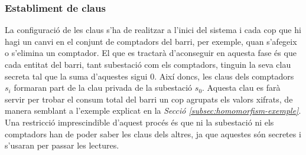 \documentclass{article}
\begin{document}
\subsubsection{Establiment de claus}\label{section:ks}
La configuració de les claus s'ha de realitzar a l'inici del sistema i cada cop que hi hagi un canvi en el conjunt de comptadors del barri, per exemple, quan s'afegeix o s'elimina un comptador. El que es tractarà d'aconseguir en aquesta fase és que cada entitat del barri, tant subestació com els comptadors, tinguin la seva clau secreta tal que la suma d'aquestes sigui 0.
Així doncs, les claus dels comptadors $s_i$ formaran part de la clau privada de la subestació $s_0$. Aquesta clau es farà servir per trobar el consum total del barri un cop agrupats els valors xifrats, de manera semblant a l'exemple explicat en la \textit{Secció \ref{subsec:homomorfism-exemple}}. Una restricció imprescindible d'aquest procés és que ni la subestació ni els comptadors han de poder saber les claus dels altres, ja que aquestes són secretes i s'usaran per passar les lectures.
\end{document}
